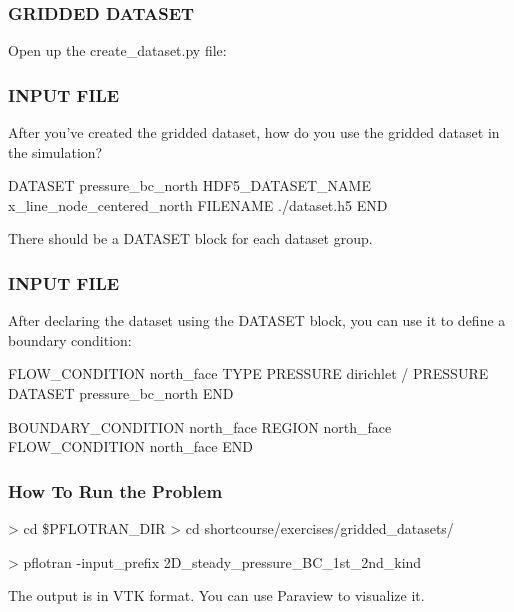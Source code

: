 \documentclass{beamer}
\begin{document}
\begin{frame}\frametitle{GRIDDED DATASET}

Open up the create\_dataset.py file:

\end{frame}

\begin{frame}\frametitle{INPUT FILE}

After you've created the gridded dataset,
how do you use the gridded dataset in the simulation? 

\begin{semiverbatim}
DATASET pressure_bc_north
  HDF5_DATASET_NAME x_line_node_centered_north
  FILENAME ./dataset.h5
END
\end{semiverbatim}

There should be a DATASET block for each dataset group.

\end{frame}

\begin{frame}\frametitle{INPUT FILE}

After declaring the dataset using the DATASET block, you can use it to
define a boundary condition:

\begin{semiverbatim}
FLOW_CONDITION north_face
  TYPE
    PRESSURE dirichlet
  /
  PRESSURE DATASET pressure_bc_north
END

BOUNDARY_CONDITION north_face
  REGION north_face
  FLOW_CONDITION north_face
END
\end{semiverbatim}

\end{frame}

\begin{frame}[fragile]\frametitle{How To Run the Problem}

\begin{semiverbatim}

 > cd \$PFLOTRAN_DIR
 > cd shortcourse/exercises/gridded_datasets/
 
 > pflotran -input_prefix 2D_steady_pressure_BC_1st_2nd_kind

\end{semiverbatim}

The output is in VTK format. You can use Paraview to visualize it.

\end{frame}
\end{document}
